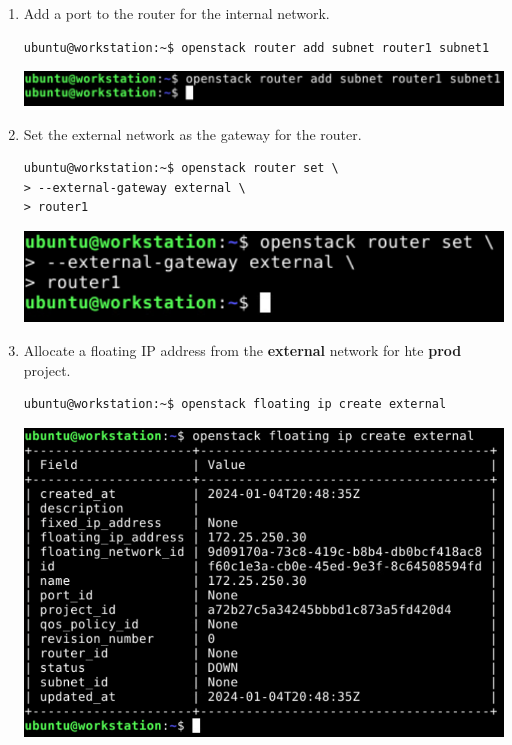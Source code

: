 \documentclass[letterpaper, 12pt]{article}
\begin{document}
\begin{enumerate}
    \item Add a port to the router for the internal network.
\begin{lstlisting}
ubuntu@workstation:~$ openstack router add subnet router1 subnet1
\end{lstlisting}

    \begin{center}
        \includegraphics[width=\linewidth]{images/part1/step24.png}
    \end{center}

    \item Set the external network as the gateway for the router.
\begin{lstlisting}
ubuntu@workstation:~$ openstack router set \
> --external-gateway external \
> router1
\end{lstlisting}

    \begin{center}
        \includegraphics[width=\linewidth]{images/part1/step25.png}
    \end{center}

    \item Allocate a floating IP address from the \textbf{external} network for hte \textbf{prod} project.
\begin{lstlisting}
ubuntu@workstation:~$ openstack floating ip create external
\end{lstlisting}

    \begin{center}
        \includegraphics[width=\linewidth]{images/part1/step26.png}
    \end{center}


\end{enumerate}
\end{document}
